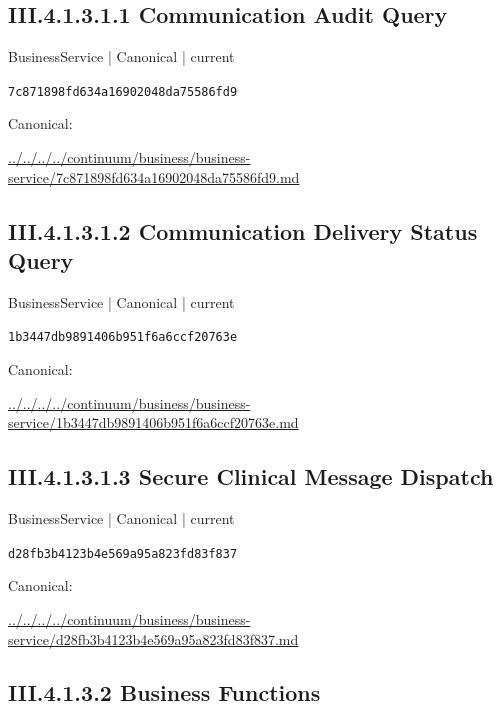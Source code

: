 \documentclass[10pt,a4paper]{article}
\begin{document}
\subsection*{III.4.1.3.1.1 Communication Audit Query}
\label{element-7c871898fd634a16902048da75586fd9}
{\small BusinessService | Canonical | current}\par
\texttt{7c871898fd634a16902048da75586fd9}\par
Canonical: \par
{\footnotesize\url{../../../../continuum/business/business-service/7c871898fd634a16902048da75586fd9.md}}\par
\subsection*{III.4.1.3.1.2 Communication Delivery Status Query}
\label{element-1b3447db9891406b951f6a6ccf20763e}
{\small BusinessService | Canonical | current}\par
\texttt{1b3447db9891406b951f6a6ccf20763e}\par
Canonical: \par
{\footnotesize\url{../../../../continuum/business/business-service/1b3447db9891406b951f6a6ccf20763e.md}}\par
\subsection*{III.4.1.3.1.3 Secure Clinical Message Dispatch}
\label{element-d28fb3b4123b4e569a95a823fd83f837}
{\small BusinessService | Canonical | current}\par
\texttt{d28fb3b4123b4e569a95a823fd83f837}\par
Canonical: \par
{\footnotesize\url{../../../../continuum/business/business-service/d28fb3b4123b4e569a95a823fd83f837.md}}\par
\subsection*{III.4.1.3.2 Business Functions}
\end{document}
